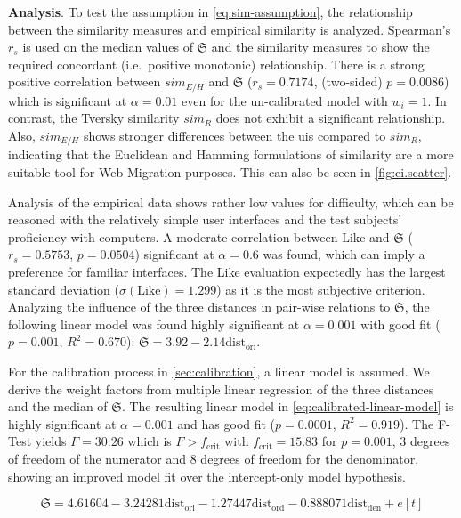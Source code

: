 \textbf{Analysis}. To test the assumption in \cref{eq:sim-assumption}, the relationship between the similarity measures and empirical similarity is analyzed.
Spearman's \(r_s\) is used on the median values of \(\mathfrak{S}\) and the similarity measures to show the required concordant (i.e.~positive monotonic) relationship.
There is a strong positive correlation between \(sim_{E/H}\) and \(\mathfrak{S}\) (\(r_s=0.7174\), (two-sided) \(p=0.0086\)) which is significant at \(\alpha=0.01\) even for the un-calibrated model with \(w_i=1\).
In contrast, the Tversky similarity \(sim_R\) does not exhibit a significant relationship.
Also, \(sim_{E/H}\) shows stronger differences between the \glspl{ui} compared to \(sim_R\), indicating that the Euclidean and Hamming formulations of similarity are a more suitable tool for \gls{Web Migration} purposes.
This can also be seen in \cref{fig:ci.scatter}.

Analysis of the empirical data shows rather low values for difficulty, which can be reasoned with the relatively simple user interfaces and the test subjects' proficiency with computers.
A moderate correlation between \(\text{Like}\) and \(\mathfrak{S}\) (\(r_s=0.5753\), \(p=0.0504\)) significant at \(\alpha=0.6\) was found, which can imply a preference for familiar interfaces.
The Like evaluation expectedly has the largest standard deviation (\(\sigma(\text{Like})=1.299\)) as it is the most subjective criterion.
Analyzing the influence of the three distances in pair-wise relations to \(\mathfrak{S}\), the following linear model was found highly significant at \(\alpha=0.001\) with good fit (\(p=0.001\), \(R^2=0.670\)): \(\mathfrak{S}=3.92 - 2.14 \text{dist}_{\text{ori}}\).

For the calibration process in \cref{sec:calibration}, a linear model is assumed.
We derive the weight factors from multiple linear regression of the three distances and the median of \(\mathfrak{S}\).
The resulting linear model in \cref{eq:calibrated-linear-model} is highly significant at \(\alpha = 0.001\) and has good fit (\(p=0.0001\), \(R^2=0.919\)).
The F-Test yields \(F=30.26\) which is \(F>f_{\text{crit}}\) with \(f_{\text{crit}}=15.83\) for \(p=0.001\), 3 degrees of freedom of the numerator and 8 degrees of freedom for the denominator, showing an improved model fit over the intercept-only model hypothesis.

\vspace{-30pt}
\begin{equation}\mathfrak{S}=4.61604 -3.24281\text{dist}_{\text{ori}} -1.27447\text{dist}_{\text{ord}} -0.888071\text{dist}_{\text{den}} + e[t] \label{eq:calibrated-linear-model}\end{equation}


